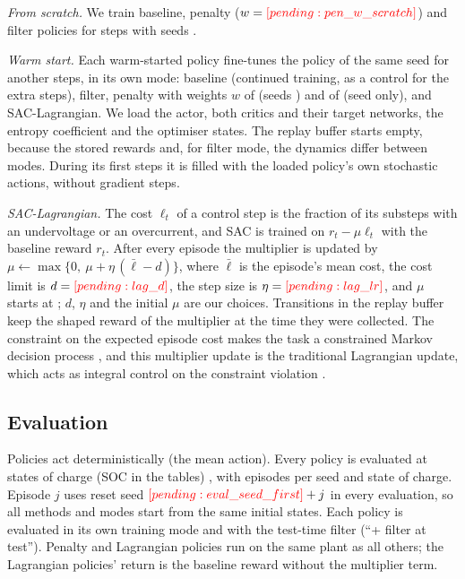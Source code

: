 \emph{From scratch.} We train baseline, penalty ($w=\res{pen_w_scratch}$) and filter policies for  steps with seeds .

\emph{Warm start.} Each warm-started policy fine-tunes the  policy of the same seed for another  steps, in its own mode: baseline (continued training, as a control for the extra steps), filter, penalty with weights $w$ of  (seeds ) and of  (seed  only), and SAC-Lagrangian. We load the actor, both critics and their target networks, the entropy coefficient and the optimiser states. The replay buffer starts empty, because the stored rewards and, for filter mode, the dynamics differ between modes. During its first  steps it is filled with the loaded policy's own stochastic actions, without gradient steps.

\emph{SAC-Lagrangian.} The cost $\ell_t$ of a control step is the fraction of its substeps with an undervoltage or an overcurrent, and SAC is trained on $r_t-\mu \ell_t$ with the baseline reward $r_t$. After every episode the multiplier is updated by $\mu \leftarrow \max\{0,\ \mu + \eta\,(\bar\ell - d)\}$, where $\bar\ell$ is the episode's mean cost, the cost limit is $d=\res{lag_d}$, the step size is $\eta=\res{lag_lr}$, and $\mu$ starts at ; $d$, $\eta$ and the initial $\mu$ are our choices. Transitions in the replay buffer keep the shaped reward of the multiplier at the time they were collected. The constraint on the expected episode cost makes the task a constrained Markov decision process \cite{altman1999cmdp}, and this multiplier update is the traditional Lagrangian update, which acts as integral control on the constraint violation \cite{stooke2020pid}.

\subsection{Evaluation}
Policies act deterministically (the mean action). Every policy is evaluated at states of charge (SOC in the tables) , with  episodes per seed and state of charge. Episode $j$ uses reset seed $\res{eval_seed_first}+j$ in every evaluation, so all methods and modes start from the same initial states. Each policy is evaluated in its own training mode and with the test-time filter (``+ filter at test''). Penalty and Lagrangian policies run on the same plant as all others; the Lagrangian policies' return is the baseline reward without the multiplier term.

